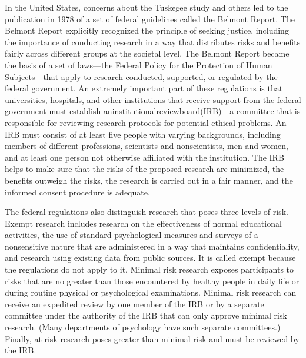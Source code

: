 In the United States, concerns about the Tuskegee study and others led to the publication in 1978 of a set of federal guidelines called the Belmont Report. The Belmont Report explicitly recognized the principle of seeking justice, including the importance of conducting research in a way that distributes risks and benefits fairly across different groups at the societal level. The Belmont Report became the basis of a set of laws---the Federal Policy for the Protection of Human Subjects---that apply to research conducted, supported, or regulated by the federal government. An extremely important part of these regulations is that universities, hospitals, and other institutions that receive support from the federal government must establish aninstitutionalreviewboard(IRB)---a committee that is responsible for reviewing research protocols for potential ethical problems. An IRB must consist of at least five people with varying backgrounds, including members of different professions, scientists and nonscientists, men and women, and at least one person not otherwise affiliated with the institution. The IRB helps to make sure that the risks of the proposed research are minimized, the benefits outweigh the risks, the research is carried out in a fair manner, and the informed consent procedure is adequate.

The federal regulations also distinguish research that poses three levels of risk. Exempt research includes research on the effectiveness of normal educational activities, the use of standard psychological measures and
surveys of a nonsensitive nature that are administered in a way that maintains confidentiality, and research using existing data from public sources. It is called exempt because the regulations do not apply to it. Minimal risk research exposes participants to risks that are no greater than those encountered by healthy people in daily life or during routine physical or psychological examinations. Minimal risk research can receive an expedited review by one member of the IRB or by a separate committee under the authority of the IRB that can only approve minimal risk research. (Many departments of psychology have such separate committees.) Finally, at-risk research poses greater than minimal risk and must be reviewed by the IRB.




